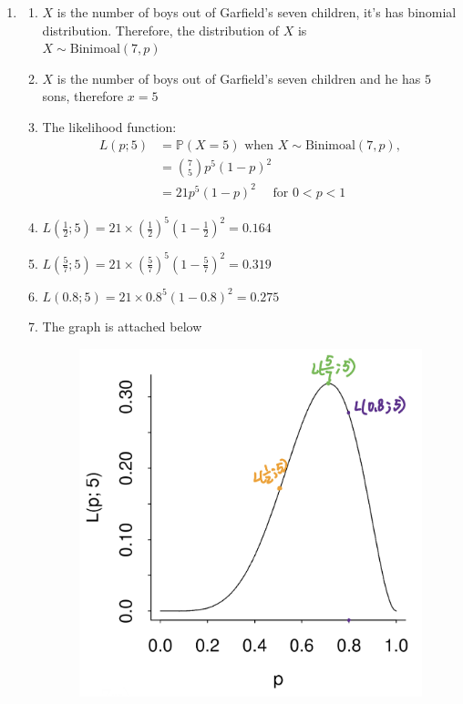 \documentclass[12pt, oneside, a4paper]{article}
\begin{document}
	\begin{enumerate}
		\item \begin{enumerate}[label = (\alph*)]
			\item $X$ is the number of boys out of Garfield's seven children, it's has binomial distribution. Therefore, the distribution of $X$ is \\
			$X \sim \text{Binimoal}(7,p)$
			\item $X$ is the number of boys out of Garfield's seven children and he has $5$ sons, therefore $x = 5$
			\item The likelihood function: \\
			\begin{align*}
				L(p; 5) & = \mathbb{P}(X =5) \text{ when } X \sim \text{Binimoal}(7,p),  \\
				& = \binom{7}{5}p^5(1-p)^2 \\
				& = 21p^5(1-p)^2 \quad \text{ for }0 < p < 1
			\end{align*}
			\item $L(\frac{1}{2}; 5) = 21 \times (\frac{1}{2})^5(1-\frac{1}{2})^2 =0.164 $
			\item $L(\frac{5}{7}; 5) = 21 \times (\frac{5}{7})^5(1-\frac{5}{7})^2 = 0.319 $
				\item $L(0.8; 5) = 21 \times 0.8^5(1-0.8)^2 =  0.275$
				\item The graph is attached below
				\begin{figure}[H]
					\centering
					\includegraphics[width=0.7\linewidth]{"PNG image 2020-08-30 00_03_38"}
					\label{fig:png-image-2020-08-30-000338}
				\end{figure}
				

\end{enumerate}
\end{enumerate}
\end{document}
